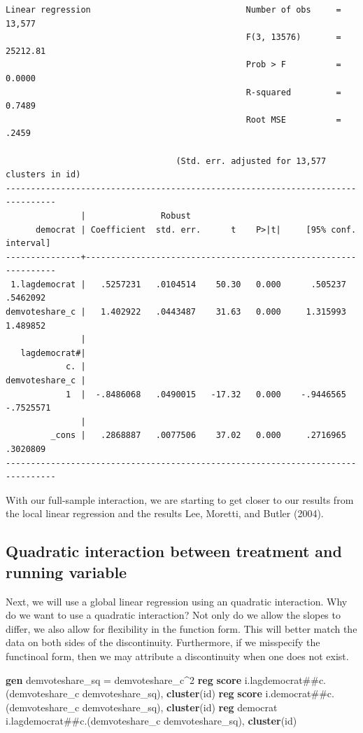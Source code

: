 \documentclass[
]{book}
\newenvironment{Shaded}{\begin{snugshade}}{\end{snugshade}}
\newcommand{\KeywordTok}[1]{\textcolor[rgb]{0.13,0.29,0.53}{\textbf{#1}}}
\newcommand{\NormalTok}[1]{#1}
\begin{document}
\begin{verbatim}
Linear regression                               Number of obs     =     13,577
                                                F(3, 13576)       =   25212.81
                                                Prob > F          =     0.0000
                                                R-squared         =     0.7489
                                                Root MSE          =      .2459

                                  (Std. err. adjusted for 13,577 clusters in id)
--------------------------------------------------------------------------------
               |               Robust
      democrat | Coefficient  std. err.      t    P>|t|     [95% conf. interval]
---------------+----------------------------------------------------------------
 1.lagdemocrat |   .5257231   .0104514    50.30   0.000      .505237    .5462092
demvoteshare_c |   1.402922   .0443487    31.63   0.000     1.315993    1.489852
               |
   lagdemocrat#|
            c. |
demvoteshare_c |
            1  |  -.8486068   .0490015   -17.32   0.000    -.9446565   -.7525571
               |
         _cons |   .2868887   .0077506    37.02   0.000     .2716965    .3020809
--------------------------------------------------------------------------------
\end{verbatim}

With our full-sample interaction, we are starting to get closer to our results from the local linear regression and the results Lee, Moretti, and Butler (2004).

\subsection{Quadratic interaction between treatment and running variable}\label{quadratic-interaction-between-treatment-and-running-variable}

Next, we will use a global linear regression using an quadratic interaction. Why do we want to use a quadratic interaction? Not only do we allow the slopes to differ, we also allow for flexibility in the function form. This will better match the data on both sides of the discontinuity. Furthermore, if we misspecify the functinoal form, then we may attribute a discontinuity when one does not exist.

\begin{Shaded}
\begin{Highlighting}[]
\KeywordTok{gen}\NormalTok{ demvoteshare\_sq = demvoteshare\_c\^{}2}
\KeywordTok{reg} \KeywordTok{score}\NormalTok{ i.lagdemocrat\#\#c.(demvoteshare\_c demvoteshare\_sq), }\KeywordTok{cluster}\NormalTok{(id)}
\KeywordTok{reg} \KeywordTok{score}\NormalTok{ i.democrat\#\#c.(demvoteshare\_c demvoteshare\_sq), }\KeywordTok{cluster}\NormalTok{(id)}
\KeywordTok{reg}\NormalTok{ democrat i.lagdemocrat\#\#c.(demvoteshare\_c demvoteshare\_sq), }\KeywordTok{cluster}\NormalTok{(id)}
\end{Highlighting}
\end{Shaded}
\end{document}
